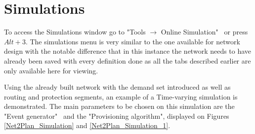 		
		
		
		
		
		
	
    \newpage
	\section*{Simulations}
	To access the Simulations window go to  "Tools $\rightarrow$ Online Simulation" \ or press $Alt + 3$. The simulations menu is very similar to the one available for network design with the notable difference that in this instance the network needs to have already been saved with every definition done as all the tabs described earlier are only available here for viewing.
	
	Using the already built network with the demand set introduced as well as routing and protection segments, an example of a Time-varying simulation is demonstrated. The main parameters to be chosen on this simulation are the "Event generator" \ and the "Provisioning algorithm", displayed on Figures \ref{Net2Plan_Simulation} and \ref{Net2Plan_Simulation_1}.
	

